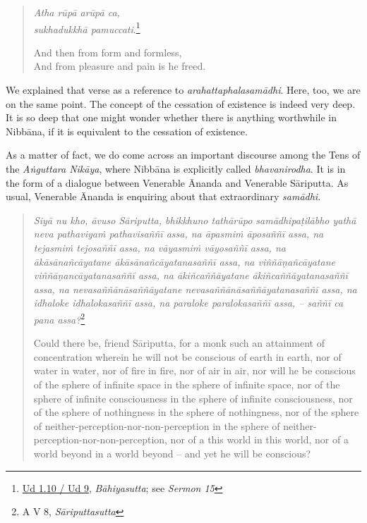 \begin{quote}
\emph{Atha rūpā arūpā ca,}\\
\emph{sukhadukkhā pamuccati}.\footnote{\href{https://suttacentral.net/ud1.10/pli/ms}{Ud 1.10 / Ud 9}, \emph{Bāhiyasutta}; see \emph{Sermon 15}}

And then from form and formless,\\
And from pleasure and pain is he freed.
\end{quote}

We explained that verse as a reference to \emph{arahattaphalasamādhi}. Here, too, we are on the same point. The concept of the cessation of existence is indeed very deep. It is so deep that one might wonder whether there is anything worthwhile in Nibbāna, if it is equivalent to the cessation of existence.

As a matter of fact, we do come across an important discourse among the Tens of the \emph{Aṅguttara Nikāya}, where Nibbāna is explicitly called \emph{bhavanirodha}. It is in the form of a dialogue between Venerable Ānanda and Venerable Sāriputta. As usual, Venerable Ānanda is enquiring about that extraordinary \emph{samādhi}.

\begin{quote}
\emph{Siyā nu kho, āvuso Sāriputta, bhikkhuno tathārūpo samādhipaṭilābho yathā neva pathaviyaṁ pathavisaññī assa, na āpasmiṁ āposaññī assa, na tejasmiṁ tejosaññī assa, na vāyasmiṁ vāyosaññī assa, na ākāsānañcāyatane ākāsānañcāyatanasaññī assa, na viññāṇañcāyatane viññāṇancāyatanasaññī assa, na ākiñcaññāyatane ākiñcaññāyatanasaññī assa, na nevasaññānāsaññāyatane nevasaññānāsaññāyatanasaññī assa, na idhaloke idhalokasaññī assa, na paraloke paralokasaññī assa, -- saññī ca pana assa?}\footnote{A V 8, \emph{Sāriputtasutta}}

Could there be, friend Sāriputta, for a monk such an attainment of concentration wherein he will not be conscious of earth in earth, nor of water in water, nor of fire in fire, nor of air in air, nor will he be conscious of the sphere of infinite space in the sphere of infinite space, nor of the sphere of infinite consciousness in the sphere of infinite consciousness, nor of the sphere of nothingness in the sphere of nothingness, nor of the sphere of neither-perception-nor-non-perception in the sphere of neither-perception-nor-non-perception, nor of a this world in this world, nor of a world beyond in a world beyond -- and yet he will be conscious?
\end{quote}

